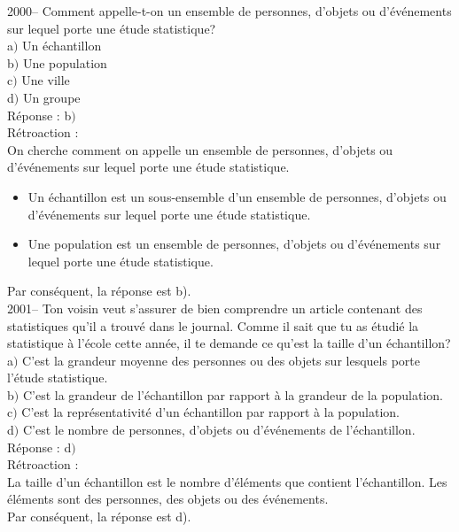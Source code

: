 \documentclass[letterpaper, 12pt]{article}
\begin{document}
2000-- Comment appelle-t-on un ensemble de personnes, d'objets ou d'\'ev\'enements sur lequel porte une \'etude statistique? \\

a$)$ Un \'echantillon \\
b$)$ Une population \\
c$)$ Une ville \\
d$)$ Un groupe \\

R\'eponse : b$)$ \\

R\'etroaction :\\
On cherche comment on appelle un ensemble de personnes, d'objets ou d'\'ev\'enements sur lequel porte une \'etude statistique.\\

\begin{itemize}
 \item Un \'echantillon est un sous-ensemble d'un ensemble de personnes, d'objets ou d'\'ev\'enements sur lequel porte une \'etude statistique. \\
\item Une population est un ensemble de personnes, d'objets ou d'\'ev\'enements sur lequel porte une \'etude statistique. \\
\end{itemize}
Par cons\'equent, la r\'eponse est b).\\

2001--  Ton voisin veut s'assurer de bien comprendre un article contenant des statistiques qu'il a trouv\'e dans le journal. Comme il sait que tu as \'etudi\'e la statistique \`a l'\'ecole cette ann\'ee, il te demande ce qu'est la taille d'un \'echantillon?\\

a$)$  C'est la grandeur moyenne des personnes ou des objets sur lesquels porte l'\'etude statistique. \\
b$)$  C'est la grandeur de l'\'echantillon par rapport \`a la grandeur de la population.\\
c$)$  C'est la repr\'esentativit\'e d'un \'echantillon par rapport \`a la population. \\
d$)$  C'est le nombre de personnes, d'objets ou d'\'ev\'enements de l'\'echantillon. \\

R\'eponse : d$)$ \\

R\'etroaction :\\
La taille d'un \'echantillon est le nombre d'\'el\'ements que contient l'\'echantillon. Les \'el\'ements sont des personnes, des objets ou des \'ev\'enements.  \\
Par cons\'equent, la r\'eponse est d).\\
\end{document}
